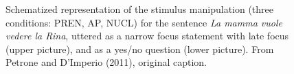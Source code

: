 \begin{figure}
\centering
{}
\caption{Schematized representation of the stimulus manipulation (three conditions: PREN, AP, NUCL) for the sentence \textit{La mamma vuole vedere la Rina}, uttered as a narrow focus statement with late focus (upper picture), and as a yes/no question (lower picture). From Petrone and D'Imperio (2011), original caption.}
\label{fig301}\end{figure}

